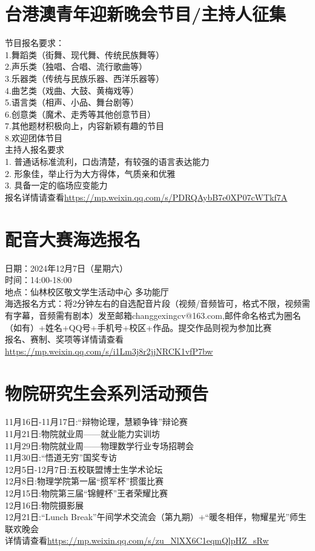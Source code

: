 \documentclass[letterpaper, 12pt]{article}
\begin{document}
\begin{multicols}{2}
\section{台港澳青年迎新晚会节目/主持人征集}
节目报名要求：\\
1.舞蹈类（街舞、现代舞、传统民族舞等）\\
2.声乐类（独唱、合唱、流行歌曲等）\\
3.乐器类（传统与民族乐器、西洋乐器等）\\
4.曲艺类（戏曲、大鼓、黄梅戏等）\\
5.语言类（相声、小品、舞台剧等）\\
6.创意类（魔术、走秀等其他创意节目）\\
7.其他题材积极向上，内容新颖有趣的节目\\
8.欢迎团体节目\\
主持人报名要求\\
1. 普通话标准流利，口齿清楚，有较强的语言表达能力\\
2. 形象佳，举止行为大方得体，气质亲和优雅\\
3. 具备一定的临场应变能力\\
报名详情请查看\url{https://mp.weixin.qq.com/s/PDRQAybB7e0XP07cWTkf7A}\\
\section{配音大赛海选报名}
日期：2024年12月7日（星期六）\\
时间：14:00-18:00\\
地点：仙林校区敬文学生活动中心 多功能厅\\
海选报名方式：将2分钟左右的自选配音片段（视频/音频皆可，格式不限，视频需有字幕，音频需有剧本）发至邮箱changgexingcv@163.com,邮件命名格式为圈名（如有）+姓名+QQ号+手机号+校区+作品。提交作品则视为参加比赛\\
报名、赛制、奖项等详情请查看\url{https://mp.weixin.qq.com/s/i1Lm3j8r2jjNRCK1vfP7bw}\\
\section{物院研究生会系列活动预告}
11月16日-11月17日:“辩物论理，慧颖争锋”辩论赛\\
11月21日:物院就业周——就业能力实训坊\\
11月29日:物院就业周——物理数学行业专场招聘会\\
11月30日:“悟道无穷”国奖专访\\
12月5日-12月7日:五校联盟博士生学术论坛\\
12月8日:物理学院第一届“掼军杯”掼蛋比赛\\
12月15日:物院第三届“锦鲤杯”王者荣耀比赛\\
12月16日:物院摄影展\\
12月21日:“Lunch Break”午间学术交流会（第九期）+“暖冬相伴，物耀星光”师生联欢晚会\\
详情请查看\url{https://mp.weixin.qq.com/s/zu_NlXX6C1eqmQlpHZ_sRw}\\
\end{multicols} 
\end{document}
